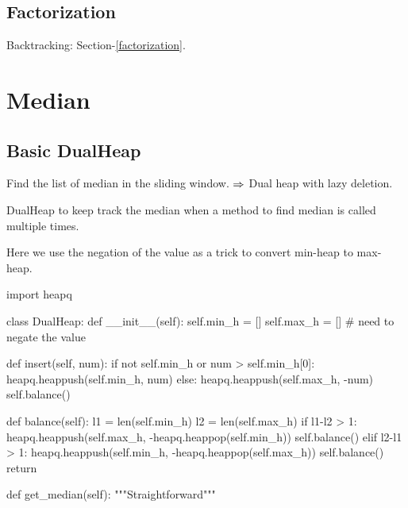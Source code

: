\subsection{Factorization}
Backtracking: Section-\ref{factorization}.

\section{Median}
\subsection{Basic DualHeap}
 Find the list of median in the sliding window. $\Rightarrow$ Dual heap with lazy deletion.

DualHeap to keep track the median when a method to find median is called multiple times.

Here we use the negation of the value as a trick to convert min-heap to max-heap.
\begin{python}
import heapq

class DualHeap:
  def __init__(self):
    self.min_h = []
    self.max_h = []  # need to negate the value 

  def insert(self, num):
    if not self.min_h or num > self.min_h[0]:
      heapq.heappush(self.min_h, num)
    else:
      heapq.heappush(self.max_h, -num)
    self.balance()

  def balance(self):
    l1 = len(self.min_h)
    l2 = len(self.max_h)
    if l1-l2 > 1:
      heapq.heappush(self.max_h, 
                     -heapq.heappop(self.min_h))
      self.balance()
    elif l2-l1 > 1:
      heapq.heappush(self.min_h, 
                     -heapq.heappop(self.max_h))
      self.balance()
    return

  def get_median(self):
    """Straightforward"""
\end{python}

